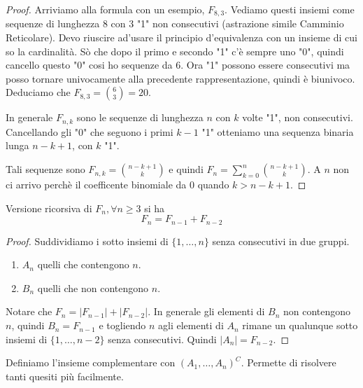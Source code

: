 \begin{proof}
Arriviamo alla formula con un esempio, $F_{8,3}$. Vediamo questi insiemi come sequenze di lunghezza 8 con 3 "1" non consecutivi (astrazione simile Camminio Reticolare). Devo riuscire ad'usare il principio d'equivalenza con un insieme di cui so la cardinalità. Sò che dopo il primo e secondo "1" c'è sempre uno "0", quindi cancello questo "0" cosi ho sequenze da 6.
Ora "1" possono essere consecutivi ma posso tornare univocamente alla precedente rappresentazione, quindi è biunivoco.
Deduciamo che $F_{8,3}=\binom{6}{3}=20$.

In generale $F_{n,k}$ sono le sequenze di lunghezza $n$ con $k$ volte "1", non consecutivi. Cancellando gli "0" che seguono i primi $k-1$ "1" otteniamo una sequenza binaria lunga $n-k+1$, con $k$ "1".

Tali sequenze sono $F_{n,k}=\binom{n-k+1}{k}$ e quindi $F_n=\sum_{k=0}^n\binom{n-k+1}{k}$.
A $n$ non ci arrivo perchè il coefficente binomiale da 0 quando $k>n-k+1$.
\end{proof}

Versione ricorsiva di $F_n, \forall n \geqslant 3$ si ha \[F_n=F_{n-1}+F_{n-2}\]

\begin{proof}
	Suddividiamo i sotto insiemi di $\{1,\dots,n\}$ senza consecutivi in due gruppi.
	\begin{enumerate}
		\item $A_n$ quelli che contengono $n$.
		\item $B_n$ quelli che non contengono $n$.
	\end{enumerate}
	Notare che $F_n=|F_{n-1}|+|F_{n-2}|$.  In generale gli elementi di $B_n$ non contengono $n$, quindi $B_n=F_{n-1}$ e  togliendo $n$ agli elementi di $A_n$ rimane un  qualunque sotto insiemi di $\{1,\dots,n-2\}$ senza consecutivi. Quindi $|A_n|=F_{n-2}$.
\end{proof}


Definiamo l'insieme complementare con $(A_1,\dots,A_n)^C$. Permette di risolvere tanti quesiti più facilmente.

